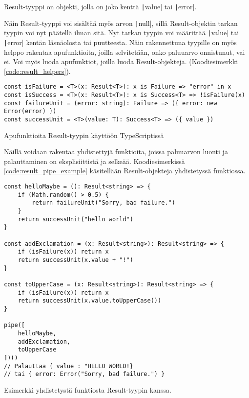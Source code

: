 Result-tyyppi on objekti, jolla on joko kenttä \texttt|value| tai \texttt|error|.

Näin Result-tyyppi voi sisältää myös arvon \texttt|null|, sillä Result-objektin tarkan tyypin voi nyt päätellä ilman sitä. Nyt tarkan tyypin voi määrittää \texttt|value| tai \texttt|error| kentän läsnäolosta tai puutteesta. Näin rakennettuna tyypille on myös helppo rakentaa apufunktioita, joilla selvitetään, onko paluuarvo onnistunut, vai ei. Voi myös luoda apufunktiot, joilla luoda Result-objekteja. (Koodiesimerkki \ref{code:result_helpers}).

\begin{code}
    \begin{verbatim}
const isFailure = <T>(x: Result<T>): x is Failure => "error" in x
const isSuccess = <T>(x: Result<T>): x is Success<T> => !isFailure(x)
const failureUnit = (error: string): Failure => ({ error: new Error(error) })
const successUnit = <T>(value: T): Success<T> => ({ value })
    \end{verbatim}
    \caption{Apufunktioita Result-tyypin käyttöön TypeScriptissä}
    \label{code:result_helpers}
\end{code}

Näillä voidaan rakentaa yhdistettyjä funktioita, joissa paluuarvon luonti ja palauttaminen on eksplisiittistä ja selkeää. Koodiesimerkissä \ref{code:result_pipe_example} käsitellään Result-objekteja yhdistetyssä funktiossa.

\begin{code}
    \begin{verbatim}
const helloMaybe = (): Result<string> => {
    if (Math.random() > 0.5) {
        return failureUnit("Sorry, bad failure.")
    }
    return successUnit("hello world")
}

const addExclamation = (x: Result<string>): Result<string> => {
    if (isFailure(x)) return x
    return successUnit(x.value + "!")
}

const toUpperCase = (x: Result<string>): Result<string> => {
    if (isFailure(x)) return x
    return successUnit(x.value.toUpperCase())
}

pipe([
    helloMaybe,
    addExclamation,
    toUpperCase
])()
// Palauttaa { value : "HELLO WORLD!}
// tai { error: Error("Sorry, bad failure.") }
    \end{verbatim}
    \caption{Esimerkki yhdistetystä funktiosta Result-tyypin kanssa.}
    \label{code:result_pipe_example}
\end{code}

